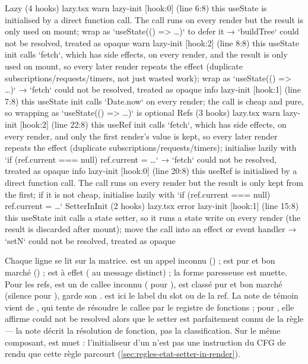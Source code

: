 \begin{sortie}
  Lazy  (4 hooks)  lazy.tsx
    warn   lazy-init  [hook:0]  (line 6:8)  this useState is initialised by a direct function call. The call runs on every render but the result is only used on mount; wrap as `useState(() => …)` to defer it
       → `buildTree` could not be resolved, treated as opaque
    warn   lazy-init  [hook:2]  (line 8:8)  this useState init calls `fetch`, which has side effects, on every render, and the result is only used on mount, so every later render repeats the effect (duplicate subscriptions/requests/timers, not just wasted work); wrap as `useState(() => …)`
       → `fetch` could not be resolved, treated as opaque
    info   lazy-init  [hook:1]  (line 7:8)  this useState init calls `Date.now` on every render; the call is cheap and pure, so wrapping as `useState(() => …)` is optional
  Refs  (3 hooks)  lazy.tsx
    warn   lazy-init  [hook:2]  (line 22:8)  this useRef init calls `fetch`, which has side effects, on every render, and only the first render's value is kept, so every later render repeats the effect (duplicate subscriptions/requests/timers); initialise lazily with `if (ref.current === null) ref.current = …`
       → `fetch` could not be resolved, treated as opaque
    info   lazy-init  [hook:0]  (line 20:8)  this useRef is initialised by a direct function call. The call runs on every render but the result is only kept from the first; if it is not cheap, initialise lazily with `if (ref.current === null) ref.current = …`
  SetterInInit  (2 hooks)  lazy.tsx
    error  lazy-init  [hook:1]  (line 15:8)  this useState init calls a state setter, so it runs a state write on every render (the result is discarded after mount); move the call into an effect or event handler
       → `setN` could not be resolved, treated as opaque
\end{sortie}

Chaque ligne se lit sur la matrice.  est un appel inconnu (\Warning) ;  est pur et bon marché (\Info) ;  est à effet (\Warning{} au message distinct) ; la forme paresseuse est muette. Pour les refs,  est un  de callee inconnu (\Info{} pour ),  est classé pur et bon marché (silence pour ),  garde son \Warning. \code{[hook:N]} est ici le label du slot ou de la ref. La note de témoin vient de , qui tente de résoudre le callee par le registre de fonctions ; pour , elle affirme \og could not be resolved\fg{} alors que le setter est parfaitement connu de la règle --- la note décrit la résolution de fonction, pas la classification. Sur le même composant,  est muet : l'initialiseur d'un  n'est pas une instruction du CFG de rendu que cette règle parcourt (\cref{sec:regles-etat-setter-in-render}).

